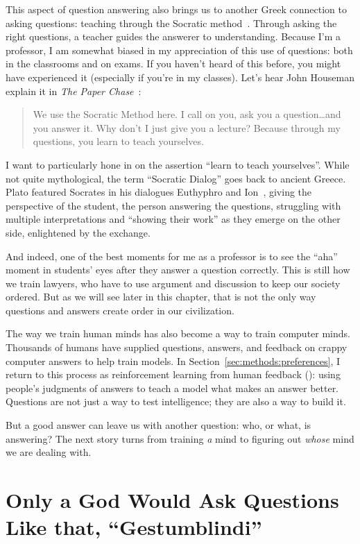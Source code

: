This aspect of question answering also brings us to another Greek
connection to asking questions: teaching through the Socratic
method~\citep{trepanier-17}.
%
Through asking the right questions, a teacher guides the answerer to
understanding.
%
Because I’m a professor, I am somewhat biased in my appreciation of this use of questions: both in the classrooms and on exams.
%
If you haven’t heard of this before, you might have experienced it (especially if you’re in my classes).
%
Let's hear John Houseman explain it in \textit{The Paper Chase}~\citep{paperchase1973}:
\begin{quote}
We use the Socratic Method here.
%
I call on you, ask you a question\dots and you answer it.
%
 Why don't I just give you a lecture?
Because through my questions, you learn to teach yourselves.
\end{quote}

I want to particularly hone in on the assertion ``learn to teach yourselves''.
%
While not quite mythological, the term ``Socratic Dialog'' goes back to ancient Greece.
%
Plato featured Socrates in his dialogues Euthyphro and Ion~\citep{PlatoDialogs},
giving the perspective of the student, the person answering the questions,
struggling with multiple interpretations and ``showing their work'' as
they emerge on the other side, enlightened by the exchange.

And indeed, one of the best moments for me as a professor is to see the ``aha''
moment in students' eyes after they answer a question correctly.
%
This is still how we train lawyers, who have to use argument
and discussion to keep our society ordered.  But as we will see later in
this chapter, that is not the only way questions and answers create
order in our civilization.

The way we train human minds has also become a way to train computer
minds.  Thousands of humans have supplied questions, answers, and feedback
on crappy computer answers to help train  models.  In
Section~\ref{sec:methods:preferences}, I return to this process as
reinforcement learning from human feedback (): using people's
judgments of answers to teach a model what makes an answer better.
Questions are not just a way to test intelligence; they are also a way to
build it.

But a good answer can leave us with another question: who, or what, is
answering?  The next story turns from training \emph{a} mind to figuring out
\emph{whose} mind we are dealing with.

\section{Only a God Would Ask Questions Like that, ``Gestumblindi''}
\label{sec:civilization:gestumblindi}

